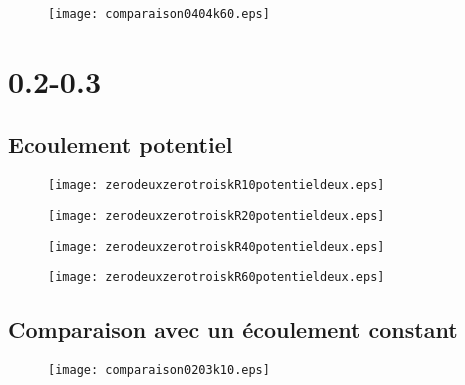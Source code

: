  \begin{figure}[ht]
\begin{center}
     \texttt{[image: comparaison0404k60.eps]}
\end{center}
\caption{}

\end{figure}


\section{0.2-0.3}
\subsection{Ecoulement potentiel}
\begin{figure}[ht]
\begin{center}
     \texttt{[image: zerodeuxzerotroiskR10potentieldeux.eps]}
\end{center}
\caption{}

\end{figure}

\begin{figure}[ht]
\begin{center}
     \texttt{[image: zerodeuxzerotroiskR20potentieldeux.eps]}
\end{center}
\caption{}

\end{figure}

\begin{figure}[ht]
\begin{center}
     \texttt{[image: zerodeuxzerotroiskR40potentieldeux.eps]}
\end{center}
\caption{}

\end{figure}
 
\begin{figure}[ht]
\begin{center}
     \texttt{[image: zerodeuxzerotroiskR60potentieldeux.eps]}
\end{center}
\caption{}

\end{figure}
\subsection{Comparaison avec un \'ecoulement constant}

 \begin{figure}[ht]
\begin{center}
     \texttt{[image: comparaison0203k10.eps]}
\end{center}
\caption{}

\end{figure}

